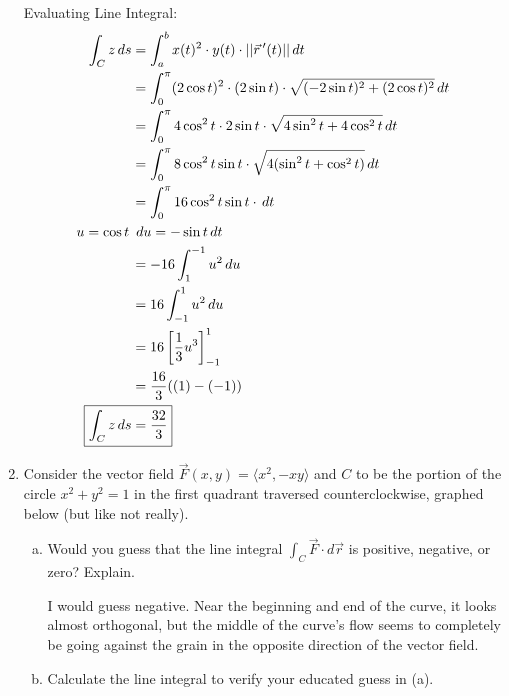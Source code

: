 \documentclass{article}
\begin{document}
\begin{enumerate}
Evaluating Line Integral:
    \begin{align*}
        \int_C z \, ds &= \int_a^b x(t)^2\cdot y(t)\cdot ||\Vec{r}\,'(t)||\,dt\\
    &= \int_0^\pi (2\cos t)^2\cdot (2\sin t)\cdot \sqrt{(-2\sin t)^2+(2\cos t)^2}\,dt\\
    &= \int_0^\pi 4\cos^2 t\cdot 2\sin t\cdot \sqrt{4\sin^2 t+4\cos^2 t}\,dt\\
    &= \int_0^\pi 8\cos^2t\sin t\cdot \sqrt{4(\sin^2 t+\cos^2 t)}\,dt\\
    &= \int_0^\pi 16\cos^2t\sin t\cdot\,dt\\
    u=\cos t \,&\,\, du= -\sin t\, dt\\
    &= -16\int_1^{-1} u^2\,du\\
    &= 16\int_{-1}^1 u^2\,du\\
    &=16 \left[\frac{1}{3}u^3\right]_{-1}^1\\
    &=\frac{16}{3} ((1)-(-1))\\
\Aboxed {\int_C z\,ds & = \frac{32}{3} } \\
\end{align*}
    \item Consider the vector field $\Vec{F}(x,y)=\langle x^2,-xy\rangle$ and $C$ to be the portion of the circle $x^2+y^2=1$ in the first quadrant traversed counterclockwise, graphed below (but like not really).
    \begin{enumerate}[(a)]
        \item Would you guess that the line integral $\int_C\Vec{F}\cdot d\Vec{r}$ is positive, negative, or zero? Explain.
        
        I would guess negative. Near the beginning and end of the curve, it looks almost orthogonal, but the middle of the curve's flow seems to completely be going against the grain in the opposite direction of the vector field.
        
        \item Calculate the line integral to verify your educated guess in (a).
        

\end{enumerate}
\end{enumerate}
\end{document}
